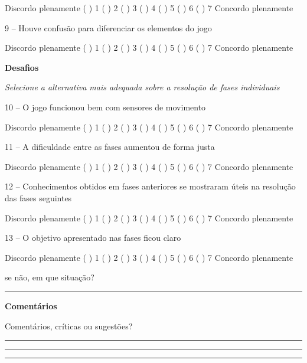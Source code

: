 Discordo plenamente ( ) 1 ( ) 2 ( ) 3 ( ) 4 ( ) 5 ( ) 6 ( ) 7 Concordo plenamente



9 – Houve confusão para diferenciar os elementos do jogo

Discordo plenamente ( ) 1 ( ) 2 ( ) 3 ( ) 4 ( ) 5 ( ) 6 ( ) 7 Concordo plenamente

\textbf{Desafios}

\textit{Selecione a alternativa mais adequada sobre a resolução de fases individuais}


10 – O jogo funcionou bem com sensores de movimento

Discordo plenamente ( ) 1 ( ) 2 ( ) 3 ( ) 4 ( ) 5 ( ) 6 ( ) 7 Concordo plenamente



11 – A dificuldade entre as fases aumentou de forma justa

Discordo plenamente ( ) 1 ( ) 2 ( ) 3 ( ) 4 ( ) 5 ( ) 6 ( ) 7 Concordo plenamente



12 – Conhecimentos obtidos em fases anteriores se mostraram úteis na resolução das fases seguintes

Discordo plenamente ( ) 1 ( ) 2 ( ) 3 ( ) 4 ( ) 5 ( ) 6 ( ) 7 Concordo plenamente



13 – O objetivo apresentado nas fases ficou claro

Discordo plenamente ( ) 1 ( ) 2 ( ) 3 ( ) 4 ( ) 5 ( ) 6 ( ) 7 Concordo plenamente

se não, em que situação? 

\rule{\linewidth-\marginparwidth}{0.4pt}


\textbf{Comentários}

Comentários, críticas ou sugestões?

\rule{\linewidth-\marginparwidth}{0.4pt}

\rule{\linewidth-\marginparwidth}{0.4pt}

\rule{\linewidth-\marginparwidth}{0.4pt}